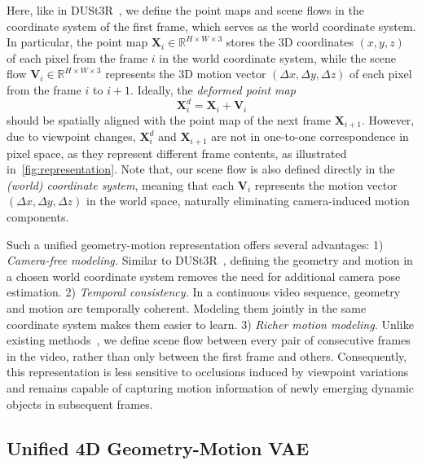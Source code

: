 Here,
like in DUSt3R~\cite{wang2024dust3r},
we define the point maps and scene flows in the coordinate system of the first frame,
which serves as the world coordinate system.
In particular,
the point map
$\bm{X}_i \in \mathbb{R}^{H\times W\times 3}$
stores the 3D coordinates
$(x, y, z)$
of each pixel from the frame
$i$
in the world coordinate system,
while the scene flow
$\bm{V}_{i} \in \mathbb{R}^{H\times W\times 3}$
represents the 3D motion vector \((\Delta x, \Delta y, \Delta z)\)
of each pixel from the frame
$i$
to
$i+1$.
Ideally, the \emph{deformed point map}
\begin{equation}
    \bm{X}_i^{d} = \bm{X}_i + \bm{V}_i
\end{equation}
should be spatially aligned with the point map of the next frame
$\bm{X}_{i+1}$. 
However,
due to viewpoint changes,
$\bm{X}_i^{d}$
and
$\bm{X}_{i+1}$
are not in one-to-one correspondence in pixel space, 
as they represent different frame contents,
as illustrated in~\cref{fig:representation}.
Note that,
our scene flow is also defined directly in the \emph{(world) coordinate system},
meaning that each
$\bm{V}_i$
represents the motion vector \((\Delta x, \Delta y, \Delta z)\)
in the world space,
naturally eliminating camera-induced motion components.

Such a unified geometry-motion representation offers several advantages:
1) \emph{Camera-free modeling.} 
Similar to DUSt3R~\cite{wang2024dust3r},
defining the geometry and motion in a chosen world coordinate system removes the need for additional camera pose estimation.
2) \emph{Temporal consistency.} 
In a continuous video sequence, geometry and motion are temporally coherent. 
Modeling them jointly in the same coordinate system makes them easier to learn.
3) \emph{Richer motion modeling.}
Unlike existing methods~\cite{sucar2025dynamic,st4rtrack2025},
we define scene flow between every pair of consecutive frames in the video,
rather than only between the first frame and others.
Consequently, this representation is less sensitive to occlusions induced by viewpoint variations and remains capable of capturing motion information of newly emerging dynamic objects in subsequent frames.



\subsection{Unified 4D Geometry-Motion VAE}
\label{sec:method_vae}

